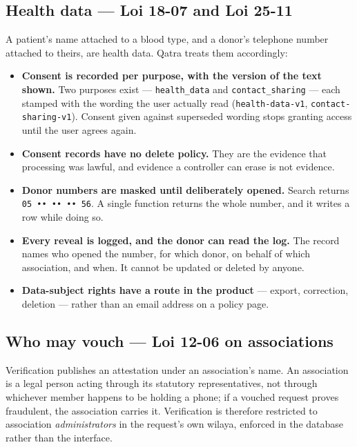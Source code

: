 \documentclass[11pt,a4paper]{article}
\begin{document}
\subsection{Health data — Loi 18-07 and Loi 25-11}

A patient's name attached to a blood type, and a donor's telephone number
attached to theirs, are health data. Qatra treats them accordingly:

\begin{itemize}[leftmargin=1.4em]
  \item \textbf{Consent is recorded per purpose, with the version of the text
        shown.} Two purposes exist — \texttt{health\_data} and
        \texttt{contact\_sharing} — each stamped with the wording the user
        actually read (\texttt{health-data-v1}, \texttt{contact-sharing-v1}).
        Consent given against superseded wording stops granting access until
        the user agrees again.
  \item \textbf{Consent records have no delete policy.} They are the evidence
        that processing was lawful, and evidence a controller can erase is not
        evidence.
  \item \textbf{Donor numbers are masked until deliberately opened.} Search
        returns \texttt{05 •• •• •• 56}. A single function returns the whole
        number, and it writes a row while doing so.
  \item \textbf{Every reveal is logged, and the donor can read the log.} The
        record names who opened the number, for which donor, on behalf of which
        association, and when. It cannot be updated or deleted by anyone.
  \item \textbf{Data-subject rights have a route in the product} — export,
        correction, deletion — rather than an email address on a policy page.
\end{itemize}

\subsection{Who may vouch — Loi 12-06 on associations}

Verification publishes an attestation under an association's name. An
association is a legal person acting through its statutory representatives, not
through whichever member happens to be holding a phone; if a vouched request
proves fraudulent, the association carries it. Verification is therefore
restricted to association \emph{administrators} in the request's own wilaya,
enforced in the database rather than the interface.
\end{document}
